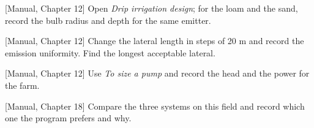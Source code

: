 \begin{exlist}
\item {\color{khblue}[Manual, Chapter 12]} Open \emph{Drip irrigation design}; for the loam and the sand, record the bulb radius and depth for the same emitter.\par{}
\item {\color{khblue}[Manual, Chapter 12]} Change the lateral length in steps of 20 m and record the emission uniformity. Find the longest acceptable lateral.\par{}
\item {\color{khblue}[Manual, Chapter 12]} Use \emph{To size a pump} and record the head and the power for the farm.\par{}
\item {\color{khblue}[Manual, Chapter 18]} Compare the three systems on this field and record which one the program prefers and why.\par{}
\end{exlist}
